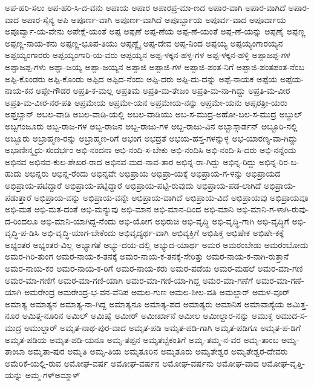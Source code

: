 ಅಪ-ಹರಿ-ಸಲು
ಅಪ-ಹರಿ-ಸಿ-ದ-ವನು
ಅಪಾಯ
ಅಪಾರ
ಅಪಾರಪ್ರ-ಮಾ-ಣದ
ಅಪಾರ-ವಾಗಿ
ಅಪಾರ-ವಾಗಿದೆ
ಅಪಾರ-ವಾದ
ಅಪಾರ-ಸೈನ್ಯ
ಅಪಿ
ಅಪೂರ್ಣ-ವಾಗಿ
ಅಪೂರ್ಣ-ವಾಗಿದೆ
ಅಪೂರ್ಬ್ಬಾಯ
ಅಪೂರ್ವ-ವಾದ
ಅಪೂರ್ವಾಯ
ಅಪೂರ್ವ್ವಾ-ಯ-ವೇನು
ಅಪೇಕ್ಷೆ-ಯಂತೆ
ಅಪ್ಪ
ಅಪ್ಪಣೆ
ಅಪ್ಪ-ಣೆಯ
ಅಪ್ಪ-ಣೆ-ಯಂತೆ
ಅಪ್ಪ-ಣೆ-ಯನ್ನು
ಅಪ್ಪಣೈ
ಅಪ್ಪಣ್ಣ
ಅಪ್ಪಣ್ಣ-ನಾಯ-ಕನು
ಅಪ್ಪಣ್ಣ-ಭೂಪ-ತಿಯು
ಅಪ್ಪಣ್ಣೈ
ಅಪ್ಪ-ದೇವ
ಅಪ್ಪ-ನಿಂದ
ಅಪ್ಪಯ್ಯ
ಅಪ್ಪಯ್ಯಂಗಾರಯ್ಯನ
ಅಪ್ಪಯ್ಯಂಗಾರರು
ಅಪ್ಪಯ್ಯಂಗಾರಿ-ಯ-ವರು
ಅಪ್ಪಯ್ಯನ
ಅಪ್ಪ-ಳಕ್ಕನ-ಹಳ್ಳ-ಗಳ
ಅಪ್ಪ-ಳಕ್ಕನ-ಹಳ್ಳಿ
ಅಪ್ಪಾಜಪ್ಪ-ಗಳ
ಅಪ್ಪಾಜಪ್ಪ-ಗಳು
ಅಪ್ಪಾ-ಜಯ್ಯ
ಅಪ್ಪಾ-ಜಯ್ಯನ
ಅಪ್ಪಾಜಿ
ಅಪ್ಪಾಜಿ-ಗಳ
ಅಪ್ಪಾಜಿ-ಪಂತ-ನಿಗೆ
ಅಪ್ಪಾಜಿ-ಪಂತಪಂತ-ನೆಂಬ
ಅಪ್ಪಿ-ಕೊಂಡರು
ಅಪ್ಪಿ-ಕೊಂಡು
ಅಪ್ಪಿದ
ಅಪ್ಪಿದ-ನೆಂದು
ಅಪ್ಪಿ-ದರು
ಅಪ್ಪಿ-ದು-ದನ್ನು
ಅಪ್ಪೆ-ನಾಯಕ
ಅಪ್ಪೆಯ
ಅಪ್ಪೆಯ-ನಾಯ-ಕನ
ಅಪ್ಪೇ-ಗೌಡರ
ಅಪ್ರತಿ-ಕ-ಮಲ್ಲ
ಅಪ್ರತಿಮ
ಅಪ್ರತಿ-ಮ-ತೇಜಂ
ಅಪ್ರತಿ-ಮ-ನಾ-ಗಿದ್ದು
ಅಪ್ರತಿ-ಮ-ವೀರ
ಅಪ್ರತಿ-ಮ-ವೀರ-ನರ-ಪತಿ
ಅಪ್ರಮೇಯ
ಅಪ್ರಮೇ-ಯನ
ಅಪ್ರಮೇಯ-ನನ್ನು
ಅಪ್ರಮೇ-ಯನು
ಅಪ್ಸರತ್ರೀ-ಯರು
ಅಫ್ತಬ್ಖಾನ್
ಅಬಲ-ವಾಡಿ
ಅಬಲ-ವಾಡಿ-ಯಲ್ಲಿ
ಅಬಲ-ವಾಡಿಯು
ಅಬ-ಸ-ಮುದ್ರ-ಅಹೋ-ಬಲ-ಸ-ಮುದ್ರ
ಅಬ್ದುಲ್
ಅಬ್ಬಗಂಜೂರು
ಅಬ್ಬ-ರಾಜ-ಗಳ
ಅಬ್ಬ-ರಾಜನ
ಅಬ್ಬ-ರಾಜು-ಗಳ
ಅಬ್ಬ-ರಾಜು-ವಿನ
ಅಬ್ಬಾಸ್ಗಾರ್ಡನ್
ಅಬ್ಬೂರಿ-ನಲ್ಲಿ
ಅಬ್ಬೂರು
ಅಬ್ರಾಹ್ಮಣ-ರನ್ನು
ಅಬ್ರಾಹ್ಮಣ-ರಿಗೆ
ಅಭಂಗ
ಅಭದ್ರತೆ
ಅಭಯ-ಹಸ್ತ-ಗಳನ್ನುಳ್ಳ
ಅಭ-ಯಾರಣ್ಯ-ವಾ-ಗಿದ್ದು
ಅಭಾಣೀನ್ಮೃದು-ಸಂದರ್ಭಂ
ಅಭಿ-ನಂದನಾ
ಅಭಿ-ನಂದಿ-ಸ-ಬೇಕು
ಅಭಿ-ನಂದಿಸಿ
ಅಭಿ-ನಂದಿ-ಸಿ-ದರು
ಅಭಿ-ನನ್ನೆಂದು
ಅಭಿನವ
ಅಭಿನವ-ಕುಲ-ಶೇಖರ-ರಾದ
ಅಭಿನವ-ಮದ-ನಾವ-ತಾರ
ಅಭಿನ್ನ-ರಾ-ಗಿದ್ದು
ಅಭಿನ್ನ-ರಿದ್ದು
ಅಭಿನ್ನ-ರಿರ-ಬ-ಹುದು
ಅಭಿನ್ನರು
ಅಭಿನ್ನ-ರೆಂದು
ಅಭಿನ್ನವೇ
ಅಭಿಪ್ರಾಯ
ಅಭಿಪ್ರಾ-ಯಕ್ಕೆ
ಅಭಿಪ್ರಾಯ-ಗ-ಳನ್ನು
ಅಭಿಪ್ರಾಯದ
ಅಭಿಪ್ರಾಯ-ಪಟಿದ್ದಾರೆ
ಅಭಿಪ್ರಾಯ-ಪಟ್ಟಿದ್ದಾರೆ
ಅಭಿಪ್ರಾಯ-ಪಟ್ಟಿ-ರುವುದು
ಅಭಿಪ್ರಾಯ-ಪಡ-ಲಾಗಿದೆ
ಅಭಿಪ್ರಾಯ-ಪಡುತ್ತಾರೆ
ಅಭಿಪ್ರಾಯ-ವನ್ನು
ಅಭಿಪ್ರಾಯ-ವನ್ನೇ
ಅಭಿಪ್ರಾಯ-ವಾಗಿದೆ
ಅಭಿಪ್ರಾಯ-ವಿದೆ
ಅಭಿಪ್ರಾಯವು
ಅಭಿಪ್ರಾಯವೂ
ಅಭಿ-ಮತ
ಅಭಿ-ಮತ-ದಂತೆ
ಅಭಿ-ಮನ್ಯುವು
ಅಭಿ-ಮಾನ
ಅಭಿ-ಮಾನ-ದಿಂದ
ಅಭಿ-ಮಾನಿ
ಅಭಿ-ಮಾನಿ-ಗ-ಳಾಗಿ-ರುವು-ದ-ರಿಂದಲೂ
ಅಭಿ-ಮಾನಿ-ಯಾಗಿದ್ದ-ನೆಂದು
ಅಭಿ-ಯೋಗ
ಅಭಿರುಚಿ
ಅಭಿ-ವೃದ್ಧಿ
ಅಭಿ-ವೃದ್ಧಿ-ಗಾಗಿ
ಅಭಿ-ವೃದ್ಧಿಗೆ
ಅಭಿ-ವೃದ್ಧಿ-ಪ-ಡಿಸಿ
ಅಭಿ-ವೃದ್ಧಿ-ಯಾಗ-ಬೇಕೆಂದು
ಅಭಿವೃದ್ಯರ್ಥ-ವಾಗಿ
ಅಭಿವ್ಯಕ್ತಿಗೆ
ಅಭಿಷಿಕ್ತ
ಅಭಿಷೇಕ
ಅಭಿಷೇ-ಕಕ್ಕೆ
ಅಭ್ಯಂತರ
ಅಭ್ಯಂತರ-ವಿಲ್ಲ
ಅಭ್ಯಾಗತೆ
ಅಭ್ಯು-ದಯ-ದಲ್ಲಿ
ಅಭ್ಯುದ-ಯಾರ್ಥ
ಅಮರ
ಅಮರಂಬೇಡು
ಅಮರಂಬೋದು
ಅಮರ-ಗಿರಿ-ತುಂಗ
ಅಮರ-ನಾಯ-ಕ-ತನಕ್ಕೆ
ಅಮರ-ನಾಯ-ಕ-ತನಕ್ಕೆ-ಸೇರಿತ್ತು
ಅಮರ-ನಾಯ-ಕ-ನಾಗಿ-ರುತ್ತಾನೆ
ಅಮರ-ನಾಯ-ಕರ
ಅಮರ-ನಾಯ-ಕ-ರಿಗೆ
ಅಮರ-ನಾಯ-ಕರು
ಅಮರ-ಪಡೆಯ
ಅಮರ-ಮಹಲೆ
ಅಮರ-ಮಾ-ಗಣಿ
ಅಮರ-ಮಾ-ಗಣಿಗೆ
ಅಮರ-ಮಾ-ಗಣಿ-ಯಾಗಿ
ಅಮರ-ಮಾ-ಗಣಿ-ಯಾ-ಗಿದ್ದ
ಅಮರ-ಮಾ-ಗಣೆಗೆ
ಅಮರ-ಮಾ-ಗಣೆ-ಯಾಗಿ
ಅಮರೇಂದ್ರ
ಅಮರೇಂದ್ರ-ಭ-ವನ-ವೆನಿಪ
ಅಮಲ-ಗುಣ
ಅಮಲ-ಶೀಲ-ವತಿ
ಅಮಲ್ದಾರ್
ಅಮಳ-ವೂರ್
ಅಮಾತ್ಯ
ಅಮಾತ್ಯನ
ಅಮಾತ್ಯ-ನಾ-ಗಿದ್ದ
ಅಮಾತ್ಯನೂ
ಅಮಾತ್ಯ-ಪದ
ಅಮಾತ್ಯರು
ಅಮಾನಿಸ
ಅಮಾವಾಸ್ಯೆಯ
ಅಮಿತ್ತ-ನೂರ
ಅಮಿತ್ತ-ನೂರಿನ
ಅಮಿಲ್
ಅಮಿಷೈ
ಅಮೀರ್
ಅಮೀರ್ಖಾನೆ
ಅಮೀಲ
ಅಮೀಲ್ದಾರ-ನನ್ನು
ಅಮುಕ್ತ
ಅಮುದ-ಸ-ಮುದ್ರ
ಅಮುಲ್ದಾರ್
ಅಮೃತ-ನಾಥ-ಪುರ-ವಾದ
ಅಮೃತ-ಪಡಿ
ಅಮೃತ-ಪಡಿ-ಗಾಗಿ
ಅಮೃತ-ಪಡಿಗೂ
ಅಮೃತ-ಪ-ಡಿಗೆ
ಅಮೃತ-ಪಡಿಯ
ಅಮೃತ-ಪಡಿ-ಯನೂ
ಅಮೃ-ತಪ್ಪನ
ಅಮೃತಬ್ಬೆಕಂತಿಗೆ
ಅಮೃ-ತಮ್ಮ-ನ-ವರ
ಅಮೃ-ತಾಂಬ
ಅಮೃ-ತಾಂಬಾ
ಅಮೃತಾ-ಪುರ
ಅಮೃತಿ
ಅಮೃ-ತಿಯ
ಅಮೃತೂರಿನ
ಅಮೃತೂರು
ಅಮೃತೇಶ್ವರ
ಅಮೃತೇಶ್ವರ-ದೇವರು
ಅಮೆರಿಕೆ-ಯಲ್ಲಿ-ರುವ
ಅಮೋಘ-ವರ್ಷ
ಅಮೋಘ-ವರ್ಷನ
ಅಮೋಘ-ವರ್ಷನು
ಅಮೋಘ-ವಾದ
ಅಮೋಘ-ವೃತ್ತಿ-ಯನ್ನು
ಅಮ್ಮ-ಗಳ್ಅಮ್ಮಾಳ್
